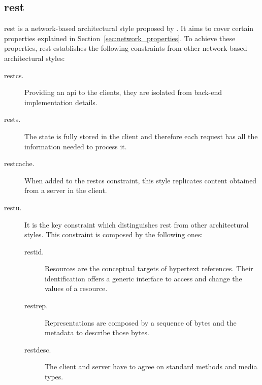 \subsection{\acl{rest}}
\label{sec:rest}

\acf{rest} is a network-based architectural style proposed by \citet{fielding_architectural_2000}.
It aims to cover certain properties explained in Section~\ref{sec:network_properties}. %
To achieve these properties, \ac{rest} establishes the following constraints from other network-based architectural styles:
\begin{description}
 \item[\acf{restcs}.] Providing an \ac{api} to the clients, they are isolated from back-end implementation details.
 \item[\acf{rests}.] The state is fully stored in the client and therefore each request has all the information needed to process it.
 \item[\acf{restcache}.] When added to the \ac{restcs} constraint, this style replicates content obtained from a server in the client.
 \item[\acf{restu}.] It is the key constraint which distinguishes \ac{rest} from other architectural styles.
                      This constraint is composed by the following ones:
    \begin{description}
	\item[\acf{restid}.] Resources are the conceptual targets of hypertext references.
			      Their identification offers a generic interface to access and change the values of a resource.
	\item[\acf{restrep}.] Representations are composed by a sequence of bytes and the metadata to describe those bytes.
	\item[\acf{restdesc}.] The client and server have to agree on standard methods and media types. %

\end{description}
\end{description}
